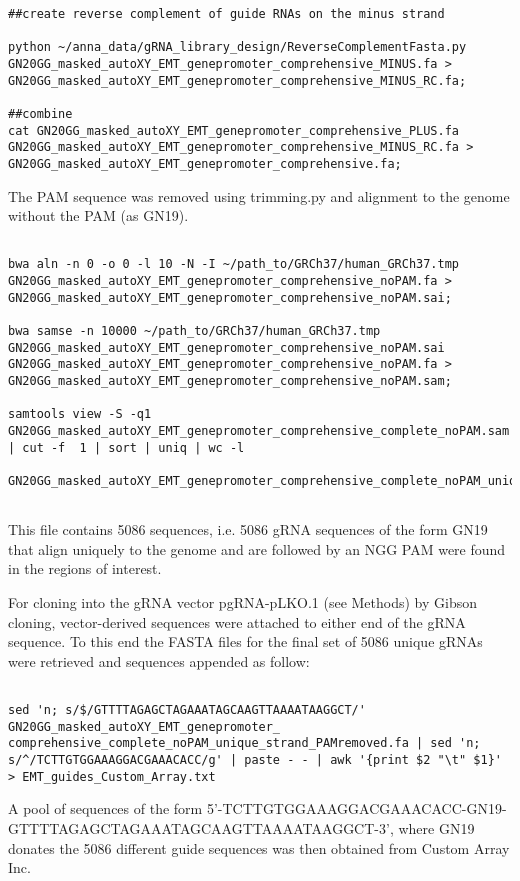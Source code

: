 \begin{footnotesize}
\begin{lstlisting}
##create reverse complement of guide RNAs on the minus strand

python ~/anna_data/gRNA_library_design/ReverseComplementFasta.py GN20GG_masked_autoXY_EMT_genepromoter_comprehensive_MINUS.fa > GN20GG_masked_autoXY_EMT_genepromoter_comprehensive_MINUS_RC.fa;

##combine
cat GN20GG_masked_autoXY_EMT_genepromoter_comprehensive_PLUS.fa GN20GG_masked_autoXY_EMT_genepromoter_comprehensive_MINUS_RC.fa > GN20GG_masked_autoXY_EMT_genepromoter_comprehensive.fa;

\end{lstlisting}

The PAM sequence was removed using trimming.py and alignment to the genome without the PAM (as GN19).

\begin{lstlisting}

bwa aln -n 0 -o 0 -l 10 -N -I ~/path_to/GRCh37/human_GRCh37.tmp
GN20GG_masked_autoXY_EMT_genepromoter_comprehensive_noPAM.fa >
GN20GG_masked_autoXY_EMT_genepromoter_comprehensive_noPAM.sai;

bwa samse -n 10000 ~/path_to/GRCh37/human_GRCh37.tmp   
GN20GG_masked_autoXY_EMT_genepromoter_comprehensive_noPAM.sai 
GN20GG_masked_autoXY_EMT_genepromoter_comprehensive_noPAM.fa > 
GN20GG_masked_autoXY_EMT_genepromoter_comprehensive_noPAM.sam;

samtools view -S -q1 
GN20GG_masked_autoXY_EMT_genepromoter_comprehensive_complete_noPAM.sam | cut -f  1 | sort | uniq | wc -l

GN20GG_masked_autoXY_EMT_genepromoter_comprehensive_complete_noPAM_unique_strand.bed


\end{lstlisting}

This file contains 5086 sequences, i.e. 5086 gRNA sequences of the form GN19 that align uniquely to the genome and are followed by an NGG PAM were found in the regions of interest.

For cloning into the gRNA vector pgRNA-pLKO.1 (see Methods) by Gibson cloning, vector-derived sequences were attached to either end of the gRNA sequence. To this end the FASTA files for the final set of 5086 unique gRNAs were retrieved and sequences appended as follow:

\begin{lstlisting}

sed 'n; s/$/GTTTTAGAGCTAGAAATAGCAAGTTAAAATAAGGCT/' GN20GG_masked_autoXY_EMT_genepromoter_ comprehensive_complete_noPAM_unique_strand_PAMremoved.fa | sed 'n; s/^/TCTTGTGGAAAGGACGAAACACC/g' | paste - - | awk '{print $2 "\t" $1}' > EMT_guides_Custom_Array.txt

\end{lstlisting}


A pool of sequences of the form 5'-TCTTGTGGAAAGGACGAAACACC-GN19-GTTTTAGAGCTAGAAATAGCAAGTTAAAATAAGGCT-3', where GN19 donates the 5086 different guide sequences was then obtained from Custom Array Inc. 



\end{footnotesize}
